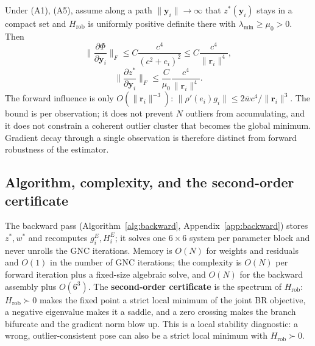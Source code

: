 \begin{proposition}\label{prop:bound}
Under (A1), (A5), assume along a path $\|\mathbf{y}_i\|\to\infty$ that
$z^*(\mathbf{y}_i)$ stays in a compact set and $H_{\mathrm{rob}}$ is uniformly positive definite
there with $\lambda_{\min}\ge\mu_0>0$. Then
\begin{equation}
\Big\|\frac{\partial\Phi}{\partial\mathbf{y}_i}\Big\|_F\le C\frac{c^4}{(c^2+e_i)^2}
\le C\frac{c^4}{\|\mathbf{r}_i\|^4},
\end{equation}
\begin{equation}
\Big\|\frac{\partial z^*}{\partial\mathbf{y}_i}\Big\|_F\le\frac{C}{\mu_0}
\frac{c^4}{\|\mathbf{r}_i\|^4}.
\end{equation}
The forward influence is only $O(\|\mathbf{r}_i\|^{-3})$:
$\|\rho'(e_i)g_i\|\le2\overline wc^4/\|\mathbf{r}_i\|^3$. The bound is per observation; it does not
prevent $N$ outliers from accumulating, and it does not constrain a coherent outlier cluster that
becomes the global minimum. Gradient decay through a single observation is therefore distinct from
forward robustness of the estimator.
\end{proposition}

\subsection{Algorithm, complexity, and the second-order certificate}

The backward pass (Algorithm~\ref{alg:backward}, Appendix~\ref{app:backward}) stores $z^*,w^*$ and
recomputes $g_i^E,H_i^E$; it solves one $6\times6$ system per parameter block and never unrolls the
GNC iterations. Memory is $O(N)$ for weights and residuals and $O(1)$ in the number of GNC
iterations; the complexity is $O(N)$ per forward iteration plus a fixed-size algebraic solve, and
$O(N)$ for the backward assembly plus $O(6^3)$. The \textbf{second-order certificate} is the
spectrum of $H_{\mathrm{rob}}$: $H_{\mathrm{rob}}\succ0$ makes the fixed point a strict local
minimum of the joint BR objective, a negative eigenvalue makes it a saddle, and a zero crossing
makes the branch bifurcate and the gradient norm blow up. This is a local stability diagnostic: a
wrong, outlier-consistent pose can also be a strict local minimum with $H_{\mathrm{rob}}\succ0$.
